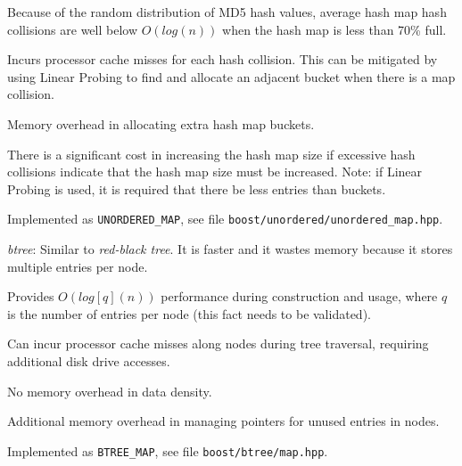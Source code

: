 \documentclass[12pt,twoside]{article}
\begin{document}
\begin{compactitem}
\begin{compactitem}
Because of the random distribution of MD5 hash values, average hash map hash collisions
are well below \begin{math}{O(log(n))}\end{math} when the hash map is less than 70\% full.
\item Incurs processor cache misses for each hash collision.
This can be mitigated by using Linear Probing to find and allocate an adjacent bucket
when there is a map collision.
\item Memory overhead in allocating extra hash map buckets.
\item There is a significant cost in increasing the hash map size
if excessive hash collisions indicate that the hash map size must be increased.
Note: if Linear Probing is used, it is required that there be less entries than buckets.
\item Implemented as \texttt{UNORDERED\_MAP},
see file \texttt{boost/unordered/unordered\_map.hpp}.
\end{compactitem}
\item \emph{btree}:
Similar to \emph{red-black tree}.  It is faster and it wastes memory
because it stores multiple entries per node.
\begin{compactitem}
\item Provides \begin{math}{O(log[q](n))}\end{math} performance during construction and usage,
where \begin{math}q\end{math} is the number of entries per node (this fact needs to be validated).
\item Can incur processor cache misses along nodes during tree traversal,
requiring additional disk drive accesses.
\item No memory overhead in data density.
\item Additional memory overhead in managing pointers for unused entries in nodes.
\item Implemented as \texttt{BTREE\_MAP},
see file \texttt{boost/btree/map.hpp}.
\end{compactitem}
\end{compactitem}
\end{document}
